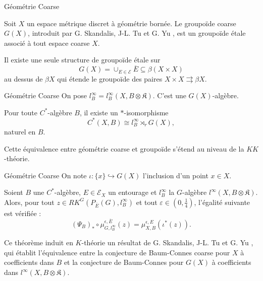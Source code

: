 \begin{frame}{Géométrie Coarse}

Soit $X$ un espace métrique discret à géométrie bornée. Le groupoïde coarse $G(X)$, introduit par G. Skandalis, J-L. Tu et G. Yu \cite{SkTuYu}, est un groupoïde étale associé à tout espace coarse $X$.\\
\vspace{0.3 cm}
\begin{definitionfr}
Il existe une seule structure de groupoïde étale sur 
\[G(X) = \cup_{E\in\mathcal E }\overline{E}\subseteq \beta (X\times X)\]
au dessus de $\beta X$ qui étende le groupoïde des paires $X\times X\rightrightarrows \beta X$.
\end{definitionfr} 

\end{frame}

\begin{frame}{Géométrie Coarse}
On pose $l_B^\infty = l_B^\infty(X,B\otimes \mathfrak K)$. C'est une $G(X)$-algèbre.\\
\vspace{0.3 cm}
\begin{propfr}
Pour toute $C^*$-algèbre $B$, il existe un $*$-isomorphisme 
\[C^*(X,B) \cong l_B^\infty \rtimes_r G(X),\]
naturel en $B$.
\end{propfr} 
\vspace{0.3 cm}
Cette équivalence entre géométrie coarse et groupoïde s'étend au niveau de la $KK$-théorie.
\end{frame}


\begin{frame}{Géométrie Coarse}
On note $\iota : \{x\}\hookrightarrow G(X)$ l'inclusion d'un point $x\in X$.\\
\vspace{0.3 cm}
\begin{thmfr}
Soient $B$ une $C^*$-algèbre, $E\in\mathcal E_X$ un entourage et $l_B^\infty$ la $G$-algèbre $l^\infty(X,B\otimes \mathfrak K)$. Alors, pour tout $z\in RK^G(P_{\overline E}(G),l_B^\infty)$ et tout $\varepsilon\in(0,\frac{1}{4})$, l'égalité suivante est vérifiée :
\[(\Psi_B)_*\circ\mu^{\epsilon,\overline E}_{G,l_B^\infty} (z) = \mu_{X,B}^{\epsilon,E}(\iota^*(z)).\]
\end{thmfr}
\vspace{0.3 cm}
Ce théorème induit en $K$-théorie un résultat de G. Skandalis, J-L. Tu et G. Yu \cite{SkTuYu}, qui établit l'équivalence entre la conjecture de Baum-Connes coarse pour $X$ à coefficients dans $B$ et la conjecture de Baum-Connes pour $G(X)$ à coefficients dans $l^\infty(X,B\otimes \mathfrak K)$.
\end{frame}

